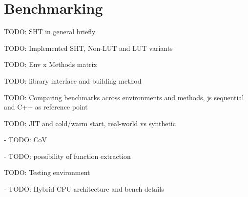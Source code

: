 \section{Benchmarking}\label{sec:benchmarking}

TODO: SHT in general briefly

TODO: Implemented SHT, Non-LUT and LUT variants

TODO: Env x Methods matrix

TODO: library interface and building method

TODO: Comparing benchmarks across environments and methods, js sequential and C++ as reference point

TODO: JIT and cold/warm start, real-world vs synthetic

- TODO: CoV

- TODO: possibility of function extraction

TODO: Testing environment

- TODO: Hybrid CPU architecture and bench details

